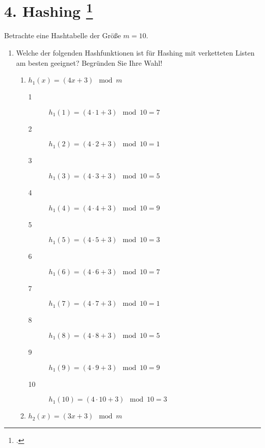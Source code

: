 \documentclass{lehramt-informatik-aufgabe}
\begin{document}

\section{4. Hashing
\footcite[Thema 2 Aufgabe 4 Seite 7]{examen:66115:2016:03}}

Betrachte eine Hashtabelle der Größe $m = 10$.

\begin{enumerate}


\item Welche der folgenden Hashfunktionen ist für Hashing mit
verketteten Listen am besten geeignet?
Begründen Sie Ihre Wahl!

\begin{enumerate}
\item $h_1(x) = (4x + 3) \mod m$

\begin{antwort}
\begin{description}
\item[1] $h_1(1) = (4 \cdot 1 + 3) \mod 10 = 7$
\item[2] $h_1(2) = (4 \cdot 2 + 3) \mod 10 = 1$
\item[3] $h_1(3) = (4 \cdot 3 + 3) \mod 10 = 5$
\item[4] $h_1(4) = (4 \cdot 4 + 3) \mod 10 = 9$
\item[5] $h_1(5) = (4 \cdot 5 + 3) \mod 10 = 3$
\item[6] $h_1(6) = (4 \cdot 6 + 3) \mod 10 = 7$
\item[7] $h_1(7) = (4 \cdot 7 + 3) \mod 10 = 1$
\item[8] $h_1(8) = (4 \cdot 8 + 3) \mod 10 = 5$
\item[9] $h_1(9) = (4 \cdot 9 + 3) \mod 10 = 9$
\item[10] $h_1(10) = (4 \cdot 10 + 3) \mod 10 = 3$
\end{description}
\end{antwort}

\item $h_2(x) = (3x + 3) \mod m$


\end{enumerate}
\end{enumerate}
\end{document}
